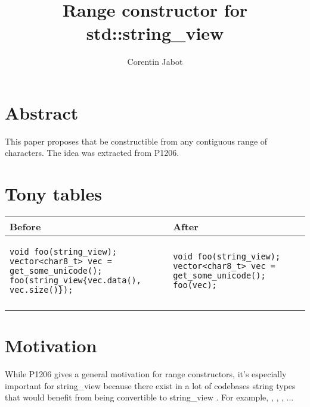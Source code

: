 \documentclass{wg21}
\title{Range constructor for std::string\_view}
\author{Corentin Jabot}{corentin.jabot@gmail.com}
\begin{document}
\maketitle

\section{Abstract}

This paper proposes that   be constructible from any contiguous range of characters.
The idea was extracted from P1206. 

\section{Tony tables}
\begin{center}
\begin{tabular}{l|l}
Before & After\\ \hline

\begin{minipage}[t]{0.5\textwidth}
\begin{verbatim}
void foo(string_view);
vector<char8_t> vec = get_some_unicode();
foo(string_view{vec.data(), vec.size()});

\end{verbatim}
\end{minipage}
&
\begin{minipage}[t]{0.5\textwidth}
\begin{verbatim}
void foo(string_view);
vector<char8_t> vec = get_some_unicode();
foo(vec);
\end{verbatim}
\end{minipage}
\\\\ \hline

\end{tabular}
\end{center}

\section{Motivation}

While P1206 gives a general motivation for range constructors, it's especially important for string_view because there exist in a lot of codebases
string types that would benefit from being convertible to string_view . For example, , , ,  ...
\end{document}
